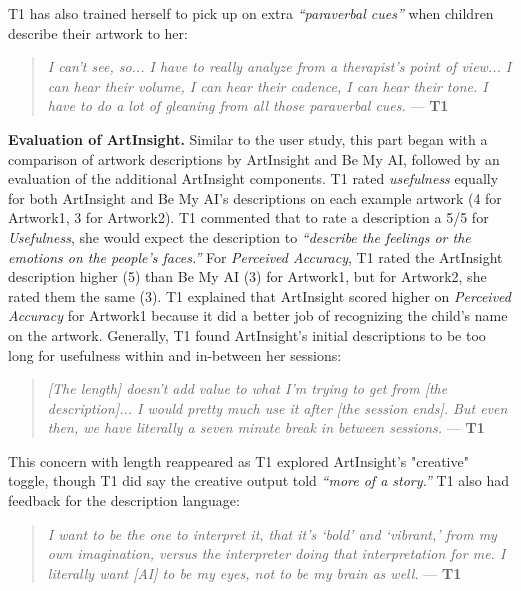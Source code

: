 \documentclass[sigconf]{acmart}
\begin{document}
T1 has also trained herself to pick up on extra \textit{``paraverbal cues''} when children describe their artwork to her: 

\begin{quote}
    \textit{I can't see, so... I have to really analyze from a therapist's point of view... I can hear their volume, I can hear their cadence, I can hear their tone. I have to do a lot of gleaning from all those paraverbal cues.} --- \textbf{T1}
\end{quote}

\textbf{Evaluation of ArtInsight.}
Similar to the user study, this part began with a comparison of artwork descriptions by ArtInsight and Be My AI, followed by an evaluation of the additional ArtInsight components. T1 rated \textit{usefulness} equally for both ArtInsight and Be My AI's descriptions on each example artwork (4 for Artwork1, 3 for Artwork2). T1 commented that to rate a description a 5/5 for \textit{Usefulness}, she would expect the description to \textit{``describe the feelings or the emotions on the people's faces.''} For \textit{Perceived Accuracy}, T1 rated the ArtInsight description higher (5) than Be My AI (3) for Artwork1, but for Artwork2, she rated them the same (3). T1 explained that ArtInsight scored higher on \textit{Perceived Accuracy} for Artwork1 because it did a better job of recognizing the child's name on the artwork. Generally, T1 found ArtInsight's initial descriptions to be too long for usefulness within and in-between her sessions:

\begin{quote}
    \textit{[The length] doesn't add value to what I'm trying to get from [the description]... I would pretty much use it after [the session ends]. But even then, we have literally a seven minute break in between sessions.} --- \textbf{T1}
\end{quote}

This concern with length reappeared as T1 explored ArtInsight's "creative" toggle, though T1 did say the creative output told \textit{``more of a story.''} T1 also had feedback for the description language:

\begin{quote}
    \textit{I want to be the one to interpret it, that it's `bold' and `vibrant,' from my own imagination, versus the interpreter doing that interpretation for me. I literally want [AI] to be my eyes, not to be my brain as well.} --- \textbf{T1}
\end{quote}
\end{document}
